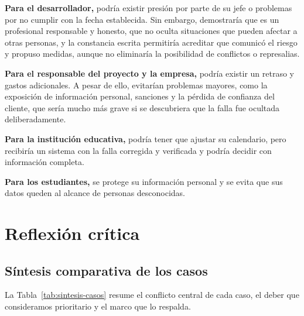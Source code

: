 \documentclass[12pt,a4paper,oneside]{article}
\begin{document}
\textbf{Para el desarrollador,} podría existir presión por parte de su jefe o problemas por no cumplir con la fecha establecida. Sin embargo, demostraría que es un profesional responsable y honesto, que no oculta situaciones que pueden afectar a otras personas, y la constancia escrita permitiría acreditar que comunicó el riesgo y propuso medidas, aunque no eliminaría la posibilidad de conflictos o represalias.

\textbf{Para el responsable del proyecto y la empresa,} podría existir un retraso y gastos adicionales. A pesar de ello, evitarían problemas mayores, como la exposición de información personal, sanciones y la pérdida de confianza del cliente, que sería mucho más grave si se descubriera que la falla fue ocultada deliberadamente.

\textbf{Para la institución educativa,} podría tener que ajustar su calendario, pero recibiría un sistema con la falla corregida y verificada y podría decidir con información completa.

\textbf{Para los estudiantes,} se protege su información personal y se evita que sus datos queden al alcance de personas desconocidas.

\clearpage
\section{Reflexión crítica}

\subsection{Síntesis comparativa de los casos}

La Tabla~\ref{tab:sintesis-casos} resume el conflicto central de cada caso, el deber que consideramos prioritario y el marco que lo respalda.
\end{document}
